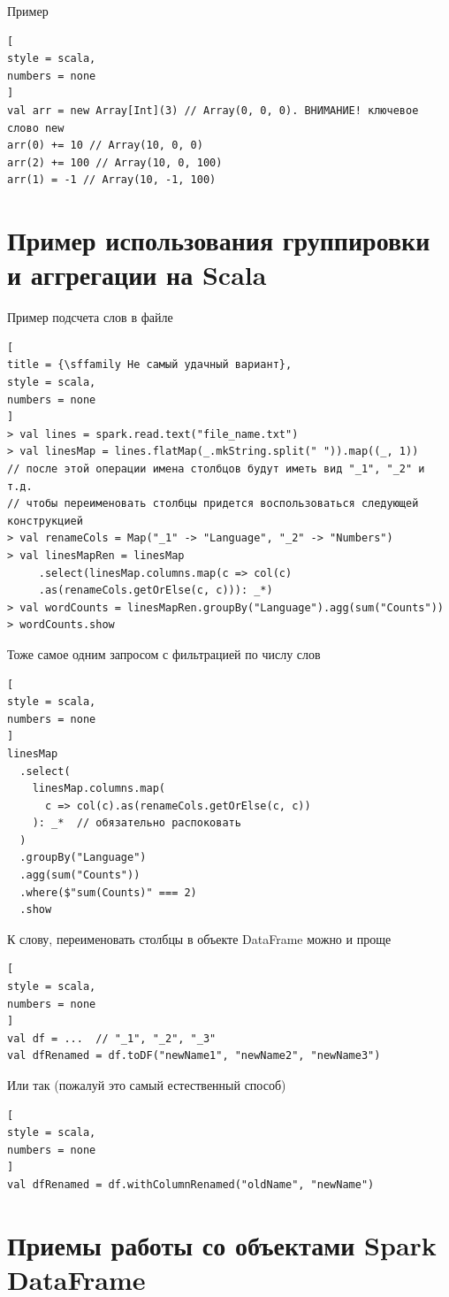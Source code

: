\documentclass[%
	11pt,
	a4paper,
	utf8,
		]{article}
\begin{document}
Пример
\begin{lstlisting}[
style = scala,
numbers = none
]
val arr = new Array[Int](3) // Array(0, 0, 0). ВНИМАНИЕ! ключевое слово new
arr(0) += 10 // Array(10, 0, 0)
arr(2) += 100 // Array(10, 0, 100)
arr(1) = -1 // Array(10, -1, 100)
\end{lstlisting}



\section{Пример использования группировки и аггрегации на Scala}

Пример подсчета слов в файле
\begin{lstlisting}[
title = {\sffamily Не самый удачный вариант},
style = scala,
numbers = none	
]
> val lines = spark.read.text("file_name.txt")
> val linesMap = lines.flatMap(_.mkString.split(" ")).map((_, 1))
// после этой операции имена столбцов будут иметь вид "_1", "_2" и т.д.
// чтобы переименовать столбцы придется воспользоваться следующей конструкцией
> val renameCols = Map("_1" -> "Language", "_2" -> "Numbers")
> val linesMapRen = linesMap
     .select(linesMap.columns.map(c => col(c)
     .as(renameCols.getOrElse(c, c))): _*)
> val wordCounts = linesMapRen.groupBy("Language").agg(sum("Counts"))
> wordCounts.show
\end{lstlisting}

Тоже самое одним запросом с фильтрацией по числу слов
\begin{lstlisting}[
style = scala,
numbers = none	
]
linesMap
  .select(
    linesMap.columns.map(
      c => col(c).as(renameCols.getOrElse(c, c))
    ): _*  // обязательно распоковать
  )
  .groupBy("Language")
  .agg(sum("Counts"))
  .where($"sum(Counts)" === 2)
  .show
\end{lstlisting}

К слову, переименовать столбцы в объекте DataFrame можно и проще 
\begin{lstlisting}[
style = scala,
numbers = none	
]
val df = ...  // "_1", "_2", "_3"
val dfRenamed = df.toDF("newName1", "newName2", "newName3")
\end{lstlisting}

Или так (пожалуй это самый естественный способ)
\begin{lstlisting}[
style = scala,
numbers = none
]
val dfRenamed = df.withColumnRenamed("oldName", "newName")
\end{lstlisting}

\section{Приемы работы со объектами Spark DataFrame}
\end{document}
